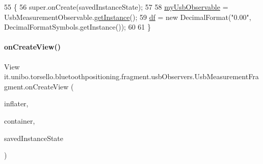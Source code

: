 \begin{DoxyCode}
55                                                               \{
56         super.onCreate(savedInstanceState);
57 
58         \hyperlink{classit_1_1unibo_1_1torsello_1_1bluetoothpositioning_1_1fragment_1_1usbObservers_1_1UsbMeasurementFragment_a7fdf4e32275a804a354c5e1c3e439970_a7fdf4e32275a804a354c5e1c3e439970}{myUsbObservable} = UsbMeasurementObservable.\hyperlink{classit_1_1unibo_1_1torsello_1_1bluetoothpositioning_1_1observables_1_1UsbMeasurementObservable_aff4f89490f3f2c11ca4feea933d12d88_aff4f89490f3f2c11ca4feea933d12d88}{getInstance}();
59         \hyperlink{classit_1_1unibo_1_1torsello_1_1bluetoothpositioning_1_1fragment_1_1usbObservers_1_1UsbMeasurementFragment_af6289af98cd03600b07581b83e267e96_af6289af98cd03600b07581b83e267e96}{df} = \textcolor{keyword}{new} DecimalFormat(\textcolor{stringliteral}{"0.00"}, DecimalFormatSymbols.getInstance());
60 
61     \}
\end{DoxyCode}
\hypertarget{classit_1_1unibo_1_1torsello_1_1bluetoothpositioning_1_1fragment_1_1usbObservers_1_1UsbMeasurementFragment_af2d8089677a375b0e8254b097072d3a5_af2d8089677a375b0e8254b097072d3a5}{}\label{classit_1_1unibo_1_1torsello_1_1bluetoothpositioning_1_1fragment_1_1usbObservers_1_1UsbMeasurementFragment_af2d8089677a375b0e8254b097072d3a5_af2d8089677a375b0e8254b097072d3a5} 
\paragraph{\texorpdfstring{on\+Create\+View()}{onCreateView()}}
{\footnotesize\ttfamily View it.\+unibo.\+torsello.\+bluetoothpositioning.\+fragment.\+usb\+Observers.\+Usb\+Measurement\+Fragment.\+on\+Create\+View (\begin{DoxyParamCaption}\item[{Layout\+Inflater}]{inflater,  }\item[{View\+Group}]{container,  }\item[{Bundle}]{saved\+Instance\+State }\end{DoxyParamCaption})}



